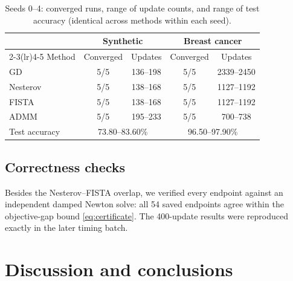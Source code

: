 \documentclass{article}
\begin{document}
\begin{table}[t]
\caption{Seeds 0--4: converged runs, range of update counts, and range of test accuracy (identical across methods within each seed).}
\label{tab:seeds}
\centering
\small
\begin{tabular}{lcccc}
\toprule
& \multicolumn{2}{c}{Synthetic} & \multicolumn{2}{c}{Breast cancer}\\
\cmidrule(lr){2-3}\cmidrule(lr){4-5}
Method & Converged & Updates & Converged & Updates\\
\midrule
GD       & 5/5 & 136--198 & 5/5 & 2339--2450\\
Nesterov & 5/5 & 138--168 & 5/5 & 1127--1192\\
FISTA    & 5/5 & 138--168 & 5/5 & 1127--1192\\
ADMM     & 5/5 & 195--233 & 5/5 & 700--738\\
\midrule
Test accuracy & \multicolumn{2}{c}{73.80--83.60\%} & \multicolumn{2}{c}{96.50--97.90\%}\\
\bottomrule
\end{tabular}
\end{table}

\subsection{Correctness checks}
Besides the Nesterov--FISTA overlap, we verified every endpoint against an independent damped Newton solve: all 54 saved endpoints agree within the objective-gap bound \eqref{eq:certificate}. The 400-update results were reproduced exactly in the later timing batch.

\section{Discussion and conclusions}
\label{sec:conclusion}
\end{document}
